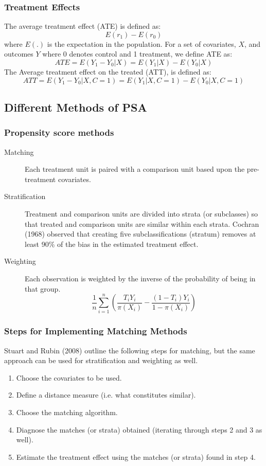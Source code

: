 \documentclass[10pt,slidestop,mathserif,c]{beamer}
\begin{document}
\begin{frame}
    \frametitle{Treatment Effects}    
    The average treatment effect (ATE) is defined as:
    $$E({ r }_{ 1 })-E({ r }_{ 0 })$$
    where $E(.)$ is the expectation in the population. For a set of covariates, $X$, and outcomes $Y$ where 0 denotes control and 1 treatment, we define ATE as:
    $$ATE=E(Y_{1}-Y_{0}|X)=E(Y_{1}|X)-E(Y_{0}|X)$$
    The Average treatment effect on the treated (ATT), is defined as:
    $$ATT=E(Y_{1}-Y_{0}|X,C=1)=E(Y_{1}|X,C=1)-E(Y_{0}|X,C=1)$$
\end{frame}

\subsection{Different Methods of PSA}

\begin{frame}
    \frametitle{Propensity score methods}
    \begin{description}
        \item[Matching] Each treatment unit is paired with a comparison unit based upon the pre-treatment covariates.
        \item[Stratification] Treatment and comparison units are divided into strata (or subclasses) so that treated and comparison units are similar within each strata. Cochran (1968) observed that creating five subclassifications (stratum) removes at least 90\% of the bias in the estimated treatment effect.
        \item[Weighting] Each observation is weighted by the inverse of the probability of being in that group.
        $$\frac { 1 }{ n } \sum _{ i=1 }^{ n }{ \left( \frac { { T }_{ i }{ Y }_{ i } }{ \pi ({ X }_{ i }) } -\frac { (1-{ T }_{ i }){ Y }_{ i } }{ 1-\pi ({ X }_{ i }) }  \right)  } $$
    \end{description}

\end{frame}

\begin{frame}
    \frametitle{Steps for Implementing Matching Methods}
    Stuart and Rubin (2008) outline the following steps for matching, but the same approach can be used for stratification and weighting as well.
    \begin{enumerate}
        \item Choose the covariates to be used.
        \item Define a distance measure (i.e. what constitutes similar).
        \item Choose the matching algorithm.
        \item Diagnose the matches (or strata) obtained (iterating through steps 2 and 3 as well).
        \item Estimate the treatment effect using the matches (or strata) found in step 4.
    \end{enumerate}

\end{frame}
\end{document}
